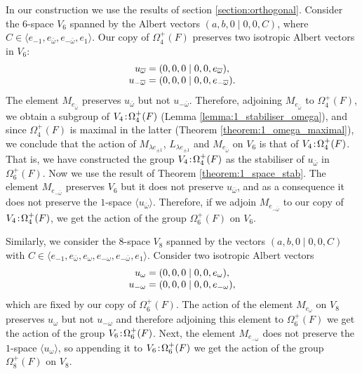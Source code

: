 In our construction we use the results of section \ref{section:orthogonal}. Consider the \mbox{$6$-space} $V_6$ spanned by the Albert vectors
$(a,b,0\mid 0,0,C)$, where $C \in \langle e_{-1}, e_{\bar{\omega}}, e_{-\bar{\omega}}, 
e_1 \rangle$. Our copy of $\Omega_4^+(F)$ preserves two isotropic Albert vectors in
 $V_6$:
\begin{equation}
	\begin{array}{r@{\;}c@{\;}l}
		u_{\bar{\omega}} & = & (0,0,0\mid 0,0,e_{\bar{\omega}}), \\
		u_{-\bar{\omega}} & = & (0,0,0\mid 0,0,e_{-\bar{\omega}}). \\
	\end{array} 
\end{equation}
The element $M_{e_{\bar{\omega}}}$ preserves $u_{\bar{\omega}}$ but not $u_{-\bar{\omega}}$.
Therefore, adjoining $M_{e_{\bar{\omega}}}$ to $\Omega_4^+(F)$, 
we obtain a subgroup
of $V_4\mathord{{\;\!{:}\;\!}}\Omega_4^+(F)$ (Lemma \ref{lemma:1_stabiliser_omega}), and since 
$\Omega_4^+(F)$
is maximal in the latter (Theorem \ref{theorem:1_omega_maximal}), we conclude that the action of $M_{\lambda e_{\pm 1}}$, 
$L_{\lambda e_{\pm 1}}$ and $M_{e_{\bar{\omega}}}$ on $V_6$ is that of 
$V_4\mathord{{\;\!{:}\;\!}}\Omega_4^+(F)$. That is, we have constructed the group 
$V_4\mathord{{\;\!{:}\;\!}}\Omega_4^+(F)$
as the stabiliser of $u_{\bar{\omega}}$ in $\Omega_6^+(F)$. 
Now we use the result of Theorem \ref{theorem:1_space_stab}. The element
 $M_{e_{-\bar{\omega}}}$ preserves $V_6$ but it does not preserve
$u_{\bar{\omega}}$, and as a consequence it does not preserve the $1$-space $\langle
u_{\bar{\omega}} \rangle$. Therefore, if we adjoin $M_{e_{-\bar{\omega}}}$ to our copy of 
$V_4\mathord{{\;\!{:}\;\!}}\Omega_4^+(F)$, we get the action of the group $\Omega_6^+(F)$ on $V_6$. 

Similarly, we consider the $8$-space $V_8$ spanned by the vectors 
$(a,b,0\mid 0,0,C)$ with $C \in \langle e_{-1}, e_{\bar{\omega}}, e_{\omega}, 
e_{- \omega}, e_{-\bar{\omega}}, e_1 \rangle$. Consider two isotropic Albert vectors
\begin{equation}
	\begin{array}{r@{\;}c@{\;}l}
		u_{\omega} & = & (0,0,0 \mid 0,0,e_{\omega}), \\
		u_{-\omega} & = & (0,0,0 \mid 0,0,e_{-\omega}),
	\end{array}
\end{equation}
which are fixed by our copy of $\Omega_6^+(F)$. The action of the element
 $M_{e_{\omega}}$
on $V_8$ preserves $u_{\omega}$ but not $u_{-\omega}$ and therefore adjoining this element
to $\Omega_6^+(F)$ we get the action of the group $V_6\mathord{{\;\!{:}\;\!}}\Omega_6^+(F)$. Next, 
the element $M_{e_{-\omega}}$ does not preserve the $1$-space $\langle u_{\omega} \rangle$,
so appending it to $V_6\mathord{{\;\!{:}\;\!}}\Omega_6^+(F)$ we get the action of the group
$\Omega_8^+(F)$ on $V_8$. 

